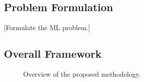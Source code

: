 \documentclass[conference]{IEEEtran}
\begin{document}
%

%
%
%



\subsection{Problem Formulation}

%
%
%
%
%

[Formulate the ML problem.]


\subsection{Overall Framework}

%
%
%

\begin{figure}[htbt]
    \centering
    \caption{Overview of the proposed methodology.}
    \label{fig:framework}
\end{figure}
\end{document}
